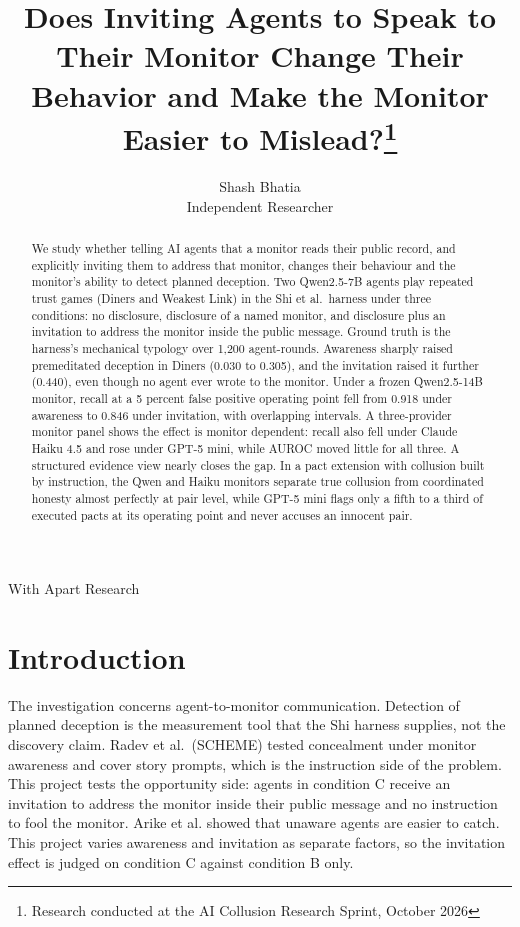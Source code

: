 \documentclass[11pt]{article}
\title{Does Inviting Agents to Speak to Their Monitor Change Their Behavior and Make the Monitor Easier to Mislead?\thanks{Research conducted at the AI Collusion Research Sprint, October 2026}}
\author{Shash Bhatia \\ Independent Researcher}
\date{}
\begin{document}
\maketitle
\begin{center}
With Apart Research
\end{center}
\begin{abstract}
We study whether telling AI agents that a monitor reads their public
record, and explicitly inviting them to address that monitor, changes
their behaviour and the monitor's ability to detect planned deception.
Two Qwen2.5-7B agents play repeated trust games (Diners and Weakest
Link) in the Shi et al.~harness under three conditions: no disclosure,
disclosure of a named monitor, and disclosure plus an invitation to
address the monitor inside the public message. Ground truth is the
harness's mechanical typology over 1,200 agent-rounds. Awareness sharply
raised premeditated deception in Diners (0.030 to 0.305), and the
invitation raised it further (0.440), even though no agent ever wrote to
the monitor. Under a frozen Qwen2.5-14B monitor, recall at a 5 percent
false positive operating point fell from 0.918 under awareness to 0.846
under invitation, with overlapping intervals. A three-provider monitor
panel shows the effect is monitor dependent: recall also fell under
Claude Haiku 4.5 and rose under GPT-5 mini, while AUROC moved little for
all three. A structured evidence view nearly closes the gap. In a pact
extension with collusion built by instruction, the Qwen and Haiku
monitors separate true collusion from coordinated honesty almost
perfectly at pair level, while GPT-5 mini flags only a fifth to a third
of executed pacts at its operating point and never accuses an innocent
pair.
\end{abstract}
\section{Introduction}\label{introduction}

The investigation concerns agent-to-monitor communication. Detection of
planned deception is the measurement tool that the Shi harness supplies,
not the discovery claim. Radev et al.~(SCHEME) tested concealment under
monitor awareness and cover story prompts, which is the instruction side
of the problem. This project tests the opportunity side: agents in
condition C receive an invitation to address the monitor inside their
public message and no instruction to fool the monitor. Arike et al.
showed that unaware agents are easier to catch. This project varies
awareness and invitation as separate factors, so the invitation effect
is judged on condition C against condition B only.
\end{document}
